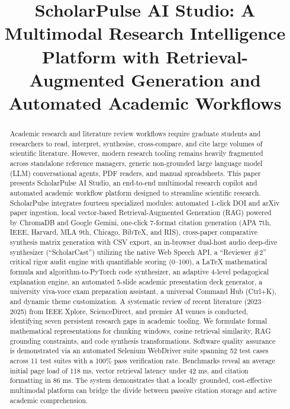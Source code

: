 \documentclass[conference]{IEEEtran}
\begin{document}
\title{ScholarPulse AI Studio: A Multimodal Research Intelligence Platform with Retrieval-Augmented Generation and Automated Academic Workflows}

\author{
}

\maketitle

\begin{abstract}
Academic research and literature review workflows require graduate students and researchers to read, interpret, synthesise, cross-compare, and cite large volumes of scientific literature. However, modern research tooling remains heavily fragmented across standalone reference managers, generic non-grounded large language model (LLM) conversational agents, PDF readers, and manual spreadsheets. This paper presents ScholarPulse AI Studio, an end-to-end multimodal research copilot and automated academic workflow platform designed to streamline scientific research. ScholarPulse integrates fourteen specialized modules: automated 1-click DOI and arXiv paper ingestion, local vector-based Retrieval-Augmented Generation (RAG) powered by ChromaDB and Google Gemini, one-click 7-format citation generation (APA 7th, IEEE, Harvard, MLA 9th, Chicago, BibTeX, and RIS), cross-paper comparative synthesis matrix generation with CSV export, an in-browser dual-host audio deep-dive synthesizer (``ScholarCast'') utilizing the native Web Speech API, a ``Reviewer \#2'' critical rigor audit engine with quantifiable scoring (0--100), a LaTeX mathematical formula and algorithm-to-PyTorch code synthesizer, an adaptive 4-level pedagogical explanation engine, an automated 5-slide academic presentation deck generator, a university viva-voce exam preparation assistant, a universal Command Hub (Ctrl+K), and dynamic theme customization. A systematic review of recent literature (2023--2025) from IEEE Xplore, ScienceDirect, and premier AI venues is conducted, identifying seven persistent research gaps in academic tooling. We formulate formal mathematical representations for chunking windows, cosine retrieval similarity, RAG grounding constraints, and code synthesis transformations. Software quality assurance is demonstrated via an automated Selenium WebDriver suite spanning 52 test cases across 11 test suites with a 100\% pass verification rate. Benchmarks reveal an average initial page load of 118 ms, vector retrieval latency under 42 ms, and citation formatting in 86 ms. The system demonstrates that a locally grounded, cost-effective multimodal platform can bridge the divide between passive citation storage and active academic comprehension.
\end{abstract}
\end{document}
